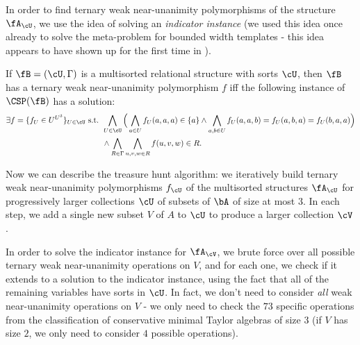 In order to find ternary weak near-unanimity polymorphisms of the structure $\fA_\cU$, we use the idea of solving an \emph{indicator instance} (we used this idea once already to solve the meta-problem for bounded width templates - this idea appears to have shown up for the first time in \cite{indicator-instance}).%

\begin{prop}\label{prop-conservative-indicator} If $\fB = (\cU, \Gamma)$ is a multisorted relational structure with sorts $\cU$, then $\fB$ has a ternary weak near-unanimity polymorphism $f$ iff the following instance of $\CSP(\fB)$ has a solution:
\begin{align*}
\exists f=\{f_U \in U^{U^3}\}_{U \in \cU}\text{ s.t. } &\bigwedge_{U \in \cU} \Big(\bigwedge_{a \in U} f_U(a,a,a) \in \{a\} \wedge \bigwedge_{a,b \in U} f_U(a,a,b) = f_U(a,b,a) = f_U(b,a,a)\Big)\\
&\wedge \bigwedge_{R \in \Gamma} \bigwedge_{u,v,w \in R} f(u,v,w) \in R.
\end{align*}
\end{prop}

Now we can describe the treasure hunt algorithm: we iteratively build ternary weak near-unanimity polymorphisms $f_\cU$ of the multisorted structures $\fA_\cU$ for progressively larger collections $\cU$ of subsets of $\bA$ of size at most $3$. In each step, we add a single new subset $V$ of $A$ to $\cU$ to produce a larger collection $\cV$.

In order to solve the indicator instance for $\fA_\cV$, we brute force over all possible ternary weak near-unanimity operations on $V$, and for each one, we check if it extends to a solution to the indicator instance, using the fact that all of the remaining variables have sorts in $\cU$. In fact, we don't need to consider \emph{all} weak near-unanimity operations on $V$ - we only need to check the $73$ specific operations from the classification of conservative minimal Taylor algebras of size $3$ (if $V$ has size $2$, we only need to consider $4$ possible operations).

